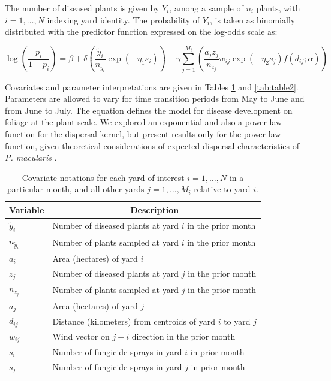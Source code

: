 \documentclass[10pt,a4paper]{article}
\begin{document}
The number of diseased plants is given by $Y_{i}$, among a sample of $n_{i}$ plants, with $i = 1,\ldots,N$ indexing yard identity. The probability of $Y_{i}$, is taken as binomially distributed with the predictor function expressed on the log-odds scale as:

\begin{equation} \label{eq:1}
\log \left(\frac{p_i}{1-p_i}\right)=\beta+\delta\left(\frac{\tilde{y}_i}{n_{\tilde{y}_i}} \exp {\left(-\eta_1 s_i\right)}\right)+\gamma \sum_{j=1}^{M_i}\left(\frac{a_j z_j}{n_{z_j}} w_{i j} \exp {\left(-\eta_2 s_j\right)} f {\left(d_{i j}; \alpha\right)}\right)
\end{equation}

Covariates and parameter interpretations are given in Tables \ref{tab:table1} and \ref{tab:table2}. Parameters are allowed to vary for time transition periods from May to June and from June to July. The equation defines the model for disease development on foliage at the plant scale. We explored an exponential and also a power-law function for the dispersal kernel, but present results only for the power-law function, given theoretical considerations of expected dispersal characteristics of \textit{P. macularis} \parencite{Severns2019}.


\begin{table}[ht]
\centering
\caption{Covariate notations for each yard of interest $i=1,\ldots, N$ in a particular month, and all other yards $j=1,\ldots,M_i$ relative to yard $i$.}
\label{tab:table1}
\begin{tabular}{ll}
\hline Variable & \multicolumn{1}{c}{Description} \\
\hline$\tilde{y}_i$ & Number of diseased plants at yard $i$ in the prior month \\
$n_{\tilde{y}_i}$ & Number of plants sampled at yard $i$ in the prior month \\
$a_i$ & Area (hectares) of yard $i$ \\
$z_j$ & Number of diseased plants at yard $j$ in the prior month \\
$n_{z_j}$ & Number of plants sampled at yard $j$ in the prior month \\
$a_j$ & Area (hectares) of yard $j$ \\
$d_{ij}$ & Distance (kilometers) from centroids of yard $i$ to yard $j$ \\
$w_{ij}$ & Wind vector on $j-i$ direction in the prior month \\
$s_i$ & Number of fungicide sprays in yard $i$ in prior month \\
$s_j$ & Number of fungicide sprays in yard $j$ in prior month\\
\hline
\end{tabular}
\end{table}
\end{document}
